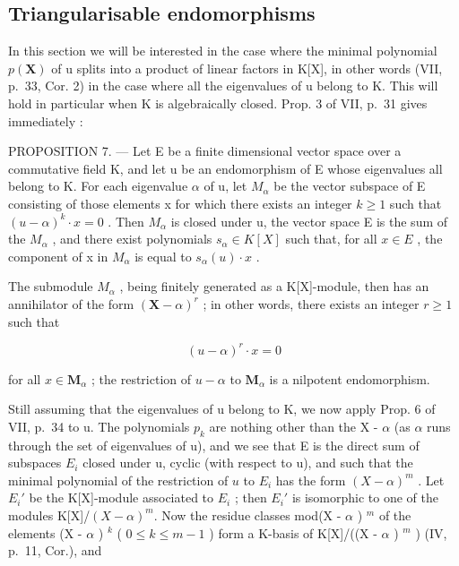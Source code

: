 \subsection{Triangularisable endomorphisms}

In this section we will be interested in the case where the minimal polynomial \(p(\mathbf{X})\) of u splits into a product of linear factors in K{[}X{]}, in other words (VII, p.~33, Cor. 2) in the case where all the eigenvalues of u belong to K. This will hold in particular when K is algebraically closed. Prop. 3 of VII, p.~31 gives immediately :

PROPOSITION 7. --- Let E be a finite dimensional vector space over a commutative field K, and let u be an endomorphism of E whose eigenvalues all belong to K. For each eigenvalue \(\alpha\) of u, let \(M_{\alpha}\) be the vector subspace of E consisting of those elements x for which there exists an integer \(k \geqslant 1\) such that \((u - \alpha)^{k} \cdot x = 0\) . Then \(M_{\alpha}\) is closed under u, the vector space E is the sum of the \(M_{\alpha}\) , and there exist polynomials \(s_{\alpha} \in K[X]\) such that, for all \(x \in E\) , the component of x in \(M_{\alpha}\) is equal to \(s_{\alpha}(u) \cdot x\) .

The submodule \(M_{\alpha}\) , being finitely generated as a K{[}X{]}-module, then has an annihilator of the form \((\mathbf{X}-\alpha)^{r}\) ; in other words, there exists an integer \(r \geqslant 1\) such that

\[
(u - \alpha) ^ {r} \cdot x = 0
\]

for all \(x \in \mathbf{M}_{\alpha}\) ; the restriction of \(u - \alpha\) to \(\mathbf{M}_{\alpha}\) is a nilpotent endomorphism.

Still assuming that the eigenvalues of u belong to K, we now apply Prop. 6 of VII, p.~34 to u. The polynomials \(p_{k}\) are nothing other than the X - \(\alpha\) (as \(\alpha\) runs through the set of eigenvalues of u), and we see that E is the direct sum of subspaces \(E_{i}\) closed under u, cyclic (with respect to u), and such that the minimal polynomial of the restriction of \(u\) to \(E_i\) has the form \((X - \alpha)^m\) . Let \(E_i'\) be the K{[}X{]}-module associated to \(E_i\) ; then \(E_i'\) is isomorphic to one of the modules K{[}X{]}/\((X - \alpha)^{m}\). Now the residue classes mod(X - \(\alpha\) ) \(^m\) of the elements (X - \(\alpha\) ) \(^k\) ( \(0 \leqslant k \leqslant m - 1\) ) form a K-basis of K{[}X{]}/((X - \(\alpha\) ) \(^m\) ) (IV, p.~11, Cor.), and

